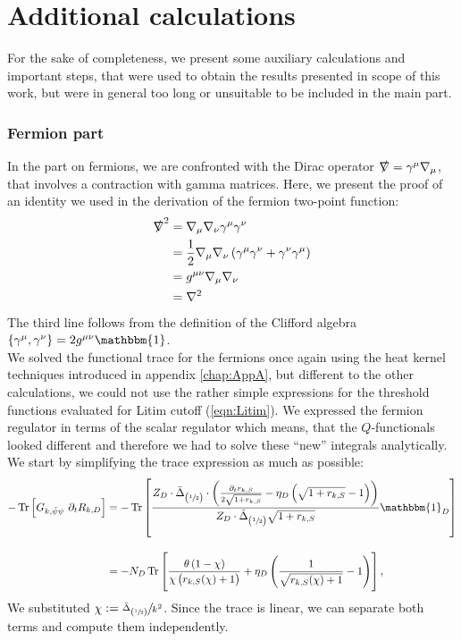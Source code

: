 \chapter{Additional calculations}\label{chap:AppB}
For the sake of completeness, we present some auxiliary calculations and important steps, that were used to obtain the results presented in scope of this work, but were in general too long or unsuitable to be included in the main part.
\subsection*{Fermion part}
In the part on fermions, we are confronted with the Dirac operator $\slashed{\nabla}=\gamma^{\mu}\nabla_{\mu}$, that involves a contraction with gamma matrices. Here, we present the proof of an identity we used in the derivation of the fermion two-point function:
\begin{equation}
	\begin{aligned}
		\slashed{\nabla}^2 &= \nabla_{\mu}\nabla_{\nu}\gamma^{\mu}\gamma^{\nu} \\
		&= \frac{1}{2}\nabla_{\mu}\nabla_{\nu}\left(\gamma^{\mu}\gamma^{\nu}+\gamma^{\nu}\gamma^{\mu}\right) \\
		&=  g^{\mu\nu}\nabla_{\mu}\nabla_{\nu}\\
		&= \nabla^2
	\end{aligned}
\end{equation} 
The third line follows from the definition of the Clifford algebra $\left\{\gamma^{\mu},\gamma^{\nu}\right\} = 2g^{\mu\nu}\mathbbm{1}$. \\

We solved the functional trace for the fermions once again using the heat kernel techniques introduced in appendix \ref{chap:AppA}, but different to the other calculations, we could not use the rather simple expressions for the threshold functions evaluated for Litim cutoff (\ref{eqn:Litim}). We expressed the fermion regulator in terms of the scalar regulator which means, that the $Q$-functionals looked different and therefore we had to solve these \enquote{new} integrals analytically. We start by simplifying the trace expression as much as possible:
\begin{equation}
\begin{aligned}
	-\tr{G_{k, \bar{\psi}\psi}\ \partial_t R_{k,D}} &=-\tr{\frac{Z_D\cdot\bar{\Delta}_{\left(\sfrac{1}{2}\right)}\cdot\left(\frac{\partial_t r_{k,S}}{2\sqrt{1+r_{k, S}}} - \eta_D\left(\sqrt{1+r_{k,S}} -1\right)\right)}{Z_D\cdot\bar{\Delta}_{\left(\sfrac{1}{2}\right)}\sqrt{1 + r_{k,S}}}\mathbbm{1}_D} \\[10pt]
	&= -N_D\tr{\frac{\theta\left(1-\chi\right)}{\chi\left(r_{k,S}(\chi)+1\right)} + \eta_D\left(\frac{1}{\sqrt{r_{k,S}(\chi) + 1}}-1\right)},
	\end{aligned}
\end{equation}
We substituted $\chi := \sfrac{\bar{\Delta}_{\left(\sfrac{1}{2}\right)}}{k^2}$. Since the trace is linear, we can separate both terms and compute them independently.
